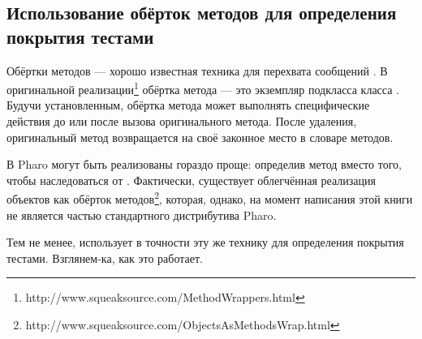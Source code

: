 \documentclass[a4paper,10pt,twoside]{book}
\begin{document}
\subsection{Использование обёрток методов для определения покрытия тестами}

Обёртки методов --- хорошо известная техника для перехвата сообщений \cite{Bran98a}.
В оригинальной реализации\footnote{http://www.squeaksource.com/MethodWrappers.html} обёртка метода --- это экземпляр подкласса класса . Будучи установленным, обёртка метода может выполнять специфические действия до или после вызова оригинального метода.
После удаления, оригинальный метод возвращается на своё законное место в словаре методов.

В Pharo  могут быть реализованы гораздо проще: определив метод  вместо того, чтобы наследоваться от . Фактически, существует облегчённая реализация объектов как обёрток методов\footnote{http://www.squeaksource.com/ObjectsAsMethodsWrap.html}, которая, однако, на момент написания этой книги не является частью стандартного дистрибутива Pharo.

Тем не менее,  использует в точности эту же технику для определения покрытия тестами.
Взглянем-ка, как это работает.
\end{document}
